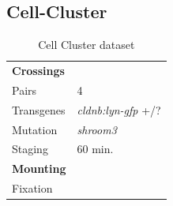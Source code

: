 \documentclass[11pt,singlespacinge,twoside]{reedthesis} %
\begin{document}
\hypertarget{cc-data}{%
\subsection{Cell-Cluster}\label{cc-data}}
\begin{longtable}[]{@{}ll@{}}
\caption{\label{tab:ccdata} Cell Cluster dataset}\tabularnewline
\toprule
\endhead
\begin{minipage}[t]{0.21\columnwidth}\raggedright
\textbf{Crossings}\strut
\end{minipage} & \begin{minipage}[t]{0.73\columnwidth}\raggedright
\strut
\end{minipage}\tabularnewline
\begin{minipage}[t]{0.21\columnwidth}\raggedright
Pairs\strut
\end{minipage} & \begin{minipage}[t]{0.73\columnwidth}\raggedright
4\strut
\end{minipage}\tabularnewline
\begin{minipage}[t]{0.21\columnwidth}\raggedright
Transgenes\strut
\end{minipage} & \begin{minipage}[t]{0.73\columnwidth}\raggedright
\emph{cldnb:lyn-gfp} +/?\strut
\end{minipage}\tabularnewline
\begin{minipage}[t]{0.21\columnwidth}\raggedright
Mutation\strut
\end{minipage} & \begin{minipage}[t]{0.73\columnwidth}\raggedright
\emph{shroom3}\strut
\end{minipage}\tabularnewline
\begin{minipage}[t]{0.21\columnwidth}\raggedright
Staging\strut
\end{minipage} & \begin{minipage}[t]{0.73\columnwidth}\raggedright
60 min.\strut
\end{minipage}\tabularnewline
\begin{minipage}[t]{0.21\columnwidth}\raggedright
\textbf{Mounting}\strut
\end{minipage} & \begin{minipage}[t]{0.73\columnwidth}\raggedright
\strut
\end{minipage}\tabularnewline
\begin{minipage}[t]{0.21\columnwidth}\raggedright
Fixation\strut
\end{minipage} & \begin{minipage}[t]{0.73\columnwidth}\raggedright

\end{minipage}
\end{longtable}
\end{document}
